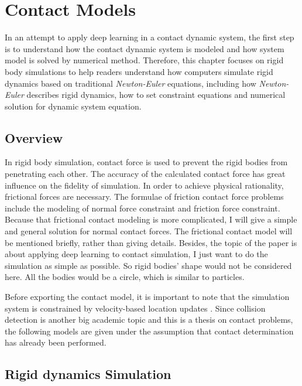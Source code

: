 
\chapter{Contact Models}
\label{cp:contact}
In an attempt to apply deep learning in a contact dynamic system, the first step is to understand how the contact dynamic system is modeled and how system model is solved by numerical method. Therefore, this chapter focuses on rigid body simulations to help readers understand how computers simulate rigid dynamics based on traditional \textit {Newton-Euler} equations, including how \textit {Newton-Euler} describes rigid dynamics, how to set constraint equations and numerical solution for dynamic system equation.

\section{Overview}

In rigid body simulation, contact force is used to prevent the rigid bodies from penetrating each other. The accuracy of the calculated contact force has great influence on the fidelity of simulation. In order to achieve physical rationality, frictional forces are necessary. The formulae of friction contact force problems include the modeling of normal force constraint and friction force constraint. Because that frictional contact modeling is more complicated, I will give a simple and general solution for normal contact forces. The frictional contact model will be mentioned briefly, rather than giving details. Besides, the topic of the paper is about applying deep learning to contact simulation, I just want to do the simulation as simple as possible. So rigid bodies' shape would not be considered here. All the bodies would be a circle, which is similar to particles.

Before exporting the contact model, it is important to note that the simulation system is constrained by velocity-based location updates \cite{Erleben:2007:VSP:1243980.1243986}. Since collision detection is another big academic topic \cite{boulic2007collision} and this is a thesis on contact problems, the following models are given under the assumption that contact determination has already been performed.

\section{Rigid dynamics Simulation}


